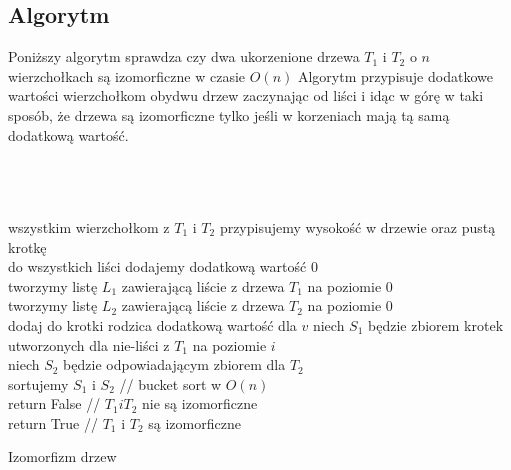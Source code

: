 \subsection{Algorytm}

Poniższy algorytm sprawdza czy dwa ukorzenione drzewa $T_1$ i $T_2$ o $n$ wierzchołkach są izomorficzne w czasie $O(n)$
Algorytm przypisuje dodatkowe wartości wierzchołkom obydwu drzew zaczynając od liści i idąc w górę w taki sposób, że drzewa są izomorficzne tylko jeśli w korzeniach mają tą samą dodatkową wartość.

\begin{algorithm}[H]
    \DontPrintSemicolon
    \\
    \\
    \\
    wszystkim wierzchołkom z $T_1$ i $T_2$ przypisujemy wysokość w drzewie oraz pustą krotkę\\
    do wszystkich liści dodajemy dodatkową wartość $0$\\
    tworzymy listę $L_1$ zawierającą liście z drzewa $T_1$ na poziomie 0 \\
    tworzymy listę $L_2$ zawierającą liście z drzewa $T_2$ na poziomie 0 \\
     {
         {
            dodaj do krotki rodzica dodatkową wartość dla $v$
        }
        niech $S_1$ będzie zbiorem krotek utworzonych dla nie-liści z $T_1$ na poziomie $i$ \\
        niech $S_2$ będzie odpowiadającym zbiorem dla $T_2$\\
        sortujemy $S_1$ i $S_2$ // bucket sort w $O(n)$ \\
         {
            return False // $T_1 i T_2$ nie są izomorficzne \\
        } 
    }
     {
        return True // $T_1$ i $T_2$ są izomorficzne
    }
    \caption{Izomorfizm drzew}
\end{algorithm}

